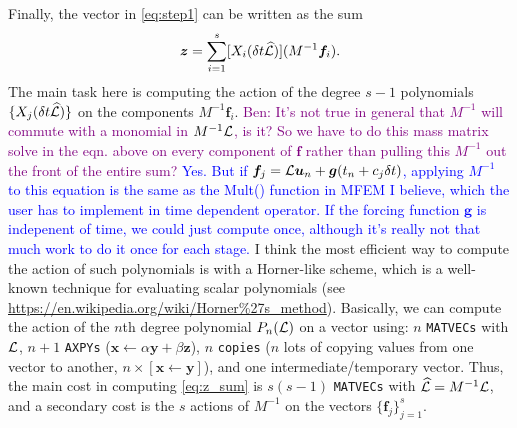 \documentclass[review]{siamart}
\newcommand{\tcb}{\textcolor{blue}}
\newcommand{\tcp}{\textcolor{purple}}
\begin{document}
Finally, the vector in \eqref{eq:step1} can be written as the sum
\begin{align} \label{eq:z_sum}
\bm{z} = \sum \limits_{i = 1}^s [X_i(\delta t \widehat{\cal L})] (M^{-1} \bm{f}_i).
\end{align}
The main task here is computing the action of the degree $s-1$ polynomials $\{X_j(\delta t \widehat{\cal L})\}$ on the components $M^{-1} \bm{f}_i$.  \tcp{Ben: It's not true in general that $M^{-1}$ will commute with a monomial in $M^{-1} {\cal L}$, is it? So we have to do this mass matrix solve in the eqn. above on every component of $\bm{f}$ rather than pulling this $M^{-1}$ out the front of the entire sum?} \tcb{Yes. But if $\bm{f}_j = {\cal L} \bm{u}_n + \bm{g}(t_n + c_j \delta t)$,
applying $M^{-1}$ to this equation is the same as the Mult() function in MFEM I believe, which the user has to
implement in time dependent operator. If the forcing function $\mathbf{g}$ is indepenent of time, we could just
compute once, although it's really not that much work to do it once for each stage.}
I think the most efficient way to compute the action of such polynomials is with a Horner-like scheme, which is a well-known technique for evaluating scalar polynomials (see \url{https://en.wikipedia.org/wiki/Horner\%27s_method}). Basically, we can compute the action of the $n$th degree polynomial $P_n({\cal L})$ on a vector using: $n$ \texttt{MATVECs} with ${\cal L}$, $n+1$ \texttt{AXPYs} ($\bm{x} \gets \alpha \bm{y} + \beta \bm{z}$), $n$ \texttt{copies} ($n$ lots of copying values from one vector to another, $n \times [\bm{x} \gets \bm{y}]$), and one intermediate/temporary vector. Thus, the main cost in computing \eqref{eq:z_sum} is $s(s-1)$ \texttt{MATVECs} with $\widehat{\cal L} = M^{-1} {\cal L}$, and a secondary cost is the $s$ actions of $M^{-1}$ on the vectors $\{\bm{f}_j\}_{j = 1}^s$.



\end{document}

